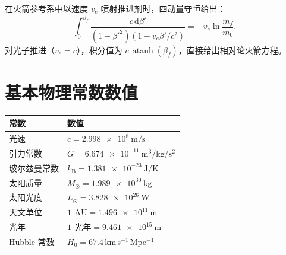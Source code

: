 \documentclass[12pt,a4paper]{article}
\newcommand{\dd}{\mathrm{d}}
\newcommand{\kB}{k_{\mathrm{B}}}
\newcommand{\AU}{\,\text{AU}}
\newcommand{\ly}{\,\text{光年}}
\newcommand{\Msun}{M_{\odot}}
\DeclareMathOperator{\atanh}{atanh}
\begin{document}
在火箭参考系中以速度 $v_e$ 喷射推进剂时，四动量守恒给出：
\begin{equation}
  \int_0^{\beta_f} \frac{c\,\dd\beta'}{(1-\beta'^2)(1 - v_e\beta'/c^2)}
  = -v_e \ln\frac{m_f}{m_0}.
\end{equation}
对光子推进（$v_e = c$），积分值为 $c\,\atanh(\beta_f)$，直接给出相对论火箭方程。

\section{基本物理常数数值}

\begin{tabular}{ll}
  \toprule
  常数 & 数值 \\
  \midrule
  光速 & $c = \SI{2.998e8}{\meter\per\second}$ \\
  引力常数 & $G = \SI{6.674e-11}{\meter\cubed\per\kilo\gram\per\second\squared}$ \\
  玻尔兹曼常数 & $\kB = \SI{1.381e-23}{\joule\per\kelvin}$ \\
  太阳质量 & $\Msun = \SI{1.989e30}{\kilo\gram}$ \\
  太阳光度 & $L_\odot = \SI{3.828e26}{\watt}$ \\
  天文单位 & $\SI{1}{\AU} = \SI{1.496e11}{\meter}$ \\
  光年 & $\SI{1}{\ly} = \SI{9.461e15}{\meter}$ \\
  Hubble 常数 & $H_0 = 67.4$\,km\,s$^{-1}$\,Mpc$^{-1}$ \\
  \bottomrule
\end{tabular}



\end{document}
